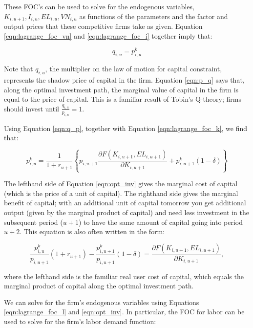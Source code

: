 \documentclass[letterpaper,12pt]{article}
\theoremstyle{definition}
\begin{document}
\begin{spacing}{1.5}
These FOC's can be used to solve for the endogenous variables, $K_{i,u+1}, I_{i,u}, EL_{i,u}, VN_{i,u}$ as functions of the parameters and the factor and output prices that these competitive firms take as given.  Equation \ref{eqn:lagrange_foc_vn} and \ref{eqn:lagrange_foc_i} together imply that:

\begin{equation}
\label{eqn:q_p}
q_{i,u} = p^{k}_{i,u}
\end{equation}

Note that $q_{i,u}$, the multiplier on the law of motion for capital constraint, represents the shadow price of capital in the firm.  Equation \ref{eqn:p_q} says that, along the optimal investment path, the marginal value of capital in the firm is equal to the price of capital.  This is a familiar result of Tobin's Q-theory; firms should invest until $\frac{q_{i,u}}{p_{i,u}}=1$. 

Using Equation \ref{eqn:q_p}, together with Equation \ref{eqn:lagrange_foc_k}, we find that:

\begin{equation}
\label{eqn:opt_inv}
p^{k}_{i,u} =  \frac{1}{1+r_{u+1}} \left\{p_{i,u+1}\frac{\partial F(K_{i,u+1},EL_{i,u+1})}{\partial K_{i,u+1}}+ p^{k}_{i,u+1}(1-\delta)  \right\} 
\end{equation}

The lefthand side of Equation \ref{eqn:opt_inv} gives the marginal cost of capital (which is the price of a unit of capital).  The righthand side gives the marginal benefit of capital; with an additional unit of capital tomorrow you get additional output (given by the marginal product of capital) and need less investment in the subsequent period ($u+1$) to have the same amount of capital going into period $u+2$.  This equation is also often written in the form:

\begin{equation}
\label{eqn:opt_inv2}
\frac{p^{k}_{i,u}}{p_{i,u+1}}(1+r_{u+1}) - \frac{p^{k}_{i,u+1}}{p_{i,u+1}}(1-\delta) =\frac{\partial F(K_{i,u+1},EL_{i,u+1})}{\partial K_{i,u+1}} , 
\end{equation}

\noindent\noindent where the lefthand side is the familiar real user cost of capital, which equals the marginal product of capital along the optimal investment path.

We can solve for the firm's endogenous variables using Equations \ref{eqn:lagrange_foc_l} and \ref{eqn:opt_inv}.  In particular, the FOC for labor can be used to solve for the firm's labor demand function:


\end{spacing}
\end{document}
